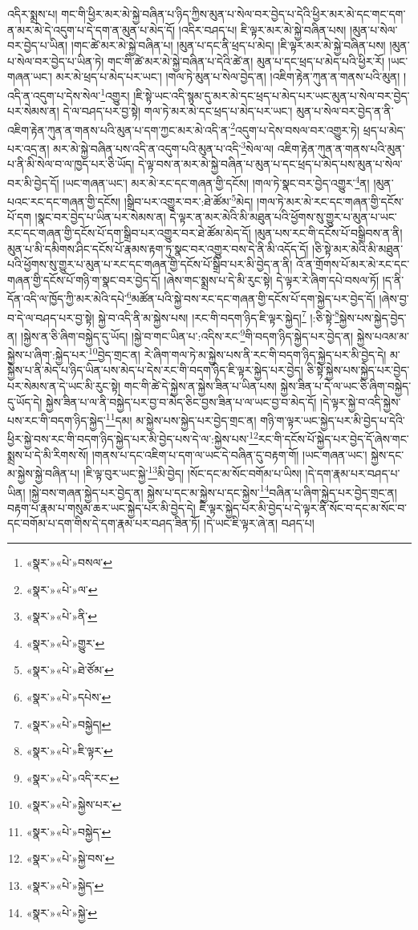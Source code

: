 འདིར་སྨྲས་པ། གང་གི་ཕྱིར་མར་མེ་སྐྱེ་བཞིན་པ་ཉིད་ཀྱིས་མུན་པ་སེལ་བར་བྱེད་པ་དེའི་ཕྱིར་མར་མེ་དང་གང་དག་ན་མར་མེ་དེ་འདུག་པ་དེ་དག་ན་མུན་པ་མེད་དོ། །འདིར་བཤད་པ། ཇི་ལྟར་མར་མེ་སྐྱེ་བཞིན་པས། །མུན་པ་སེལ་བར་བྱེད་པ་ཡིན། །གང་ཚེ་མར་མེ་སྐྱེ་བཞིན་པ། །མུན་པ་དང་ནི་ཕྲད་པ་མེད། །ཇི་ལྟར་མར་མེ་སྐྱེ་བཞིན་པས། །མུན་པ་སེལ་བར་བྱེད་པ་ཡིན་ཏེ། གང་གི་ཚེ་མར་མེ་སྐྱེ་བཞིན་པ་དེའི་ཚེ་ན། མུན་པ་དང་ཕྲད་པ་མེད་པའི་ཕྱིར་རོ། །ཡང་གཞན་ཡང་། མར་མེ་ཕྲད་པ་མེད་པར་ཡང་། །གལ་ཏེ་མུན་པ་སེལ་བྱེད་ན། །འཇིག་རྟེན་ཀུན་ན་གནས་པའི་མུན། །འདི་ན་འདུག་པ་དེས་སེལ་\footnote{«སྣར་»«པེ་»བསལ་}འགྱུར། །ཇི་སྟེ་ཡང་འདི་སྙམ་དུ་མར་མེ་དང་ཕྲད་པ་མེད་པར་ཡང་མུན་པ་སེལ་བར་བྱེད་པར་སེམས་ན། དེ་ལ་བཤད་པར་བྱ་སྟེ། གལ་ཏེ་མར་མེ་དང་ཕྲད་པ་མེད་པར་ཡང་། མུན་པ་སེལ་བར་བྱེད་ན་ནི་འཇིག་རྟེན་ཀུན་ན་གནས་པའི་མུན་པ་དག་ཀྱང་མར་མེ་འདི་ན་\footnote{«སྣར་»«པེ་»ལ་}འདུག་པ་དེས་བསལ་བར་འགྱུར་ཏེ། ཕྲད་པ་མེད་པར་འདྲ་ན། མར་མེ་སྐྱེ་བཞིན་པས་འདི་ན་འདུག་པའི་མུན་པ་འདི་\footnote{«སྣར་»«པེ་»ནི་}སེལ་ལ། འཇིག་རྟེན་ཀུན་ན་གནས་པའི་མུན་པ་ནི་མི་སེལ་བ་ལ་ཁྱད་པར་ཅི་ཡོད། དེ་ལྟ་བས་ན་མར་མེ་སྐྱེ་བཞིན་པ་མུན་པ་དང་ཕྲད་པ་མེད་པས་མུན་པ་སེལ་བར་མི་བྱེད་དོ། །ཡང་གཞན་ཡང་། མར་མེ་རང་དང་གཞན་གྱི་དངོས། །གལ་ཏེ་སྣང་བར་བྱེད་འགྱུར་\footnote{«སྣར་»«པེ་»གྱུར་}ན། །མུན་པའང་རང་དང་གཞན་གྱི་དངོས། །སྒྲིབ་པར་འགྱུར་བར་:ཐེ་ཚོམ་\footnote{«སྣར་»«པེ་»ཐེ་ཙོམ་}མེད། །གལ་ཏེ་མར་མེ་རང་དང་གཞན་གྱི་དངོས་པོ་དག །སྣང་བར་བྱེད་པ་ཡིན་པར་སེམས་ན། དེ་ལྟར་ན་མར་མེའི་མི་མཐུན་པའི་ཕྱོགས་སུ་གྱུར་པ་མུན་པ་ཡང་རང་དང་གཞན་གྱི་དངོས་པོ་དག་སྒྲིབ་པར་འགྱུར་བར་ཐེ་ཚོམ་མེད་དོ། །མུན་པས་རང་གི་དངོས་པོ་བསྒྲིབས་ན་ནི། མུན་པ་མི་དམིགས་ཤིང་དངོས་པོ་རྣམས་རྟག་ཏུ་སྣང་བར་འགྱུར་བས་དེ་ནི་མི་འདོད་དོ། །ཅི་སྟེ་མར་མེའི་མི་མཐུན་པའི་ཕྱོགས་སུ་གྱུར་པ་མུན་པ་རང་དང་གཞན་གྱི་དངོས་པོ་སྒྲིབ་པར་མི་བྱེད་ན་ནི། འོ་ན་གྲོགས་པོ་མར་མེ་རང་དང་གཞན་གྱི་དངོས་པོ་གཉི་ག་སྣང་བར་བྱེད་དོ། །ཞེས་གང་སྨྲས་པ་དེ་མི་རུང་སྟེ། དེ་ལྟར་རེ་ཞིག་དཔེ་བསལ་ཏོ། །ད་ནི་དོན་འདི་ལ་ཁྱོད་ཀྱི་མར་མེའི་དཔེ་\footnote{«སྣར་»«པེ་»དཔེས་}མཚོན་པའི་སྐྱེ་བས་རང་དང་གཞན་གྱི་དངོས་པོ་དག་སྐྱེད་པར་བྱེད་དོ། །ཞེས་བྱ་བ་དེ་ལ་བཤད་པར་བྱ་སྟེ། སྐྱེ་བ་འདི་ནི་མ་སྐྱེས་པས། །རང་གི་བདག་ཉིད་ཇི་ལྟར་སྐྱེད།\footnote{«སྣར་»«པེ་»བསྐྱེད།} །:ཅི་སྟེ་\footnote{«སྣར་»«པེ་»ཇི་ལྟར་}སྐྱེས་པས་སྐྱེད་བྱེད་ན། །སྐྱེས་ན་ཅི་ཞིག་བསྐྱེད་དུ་ཡོད། །སྐྱེ་བ་གང་ཡིན་པ་:འདིས་རང་\footnote{«སྣར་»«པེ་»འདི་རང་}གི་བདག་ཉིད་སྐྱེད་པར་བྱེད་ན། སྐྱེས་པའམ་མ་སྐྱེས་པ་ཞིག་:སྐྱེད་པར་\footnote{«སྣར་»«པེ་»སྐྱེས་པར་}བྱེད་གྲང་ན། རེ་ཞིག་གལ་ཏེ་མ་སྐྱེས་པས་ནི་རང་གི་བདག་ཉིད་སྐྱེད་པར་མི་བྱེད་དེ། མ་སྐྱེས་པ་ནི་མེད་པ་ཉིད་ཡིན་པས་མེད་པ་དེས་རང་གི་བདག་ཉིད་ཇི་ལྟར་སྐྱེད་པར་བྱེད། ཅི་སྟེ་སྐྱེས་པས་སྐྱེད་པར་བྱེད་པར་སེམས་ན་དེ་ཡང་མི་རུང་སྟེ། གང་གི་ཚེ་དེ་སྐྱེས་ན་སྐྱེས་ཟིན་པ་ཡིན་པས། སྐྱེས་ཟིན་པ་དེ་ལ་ཡང་ཅི་ཞིག་བསྐྱེད་དུ་ཡོད་དེ། སྐྱེས་ཟིན་པ་ལ་ནི་བསྐྱེད་པར་བྱ་བ་མེད་ཅིང་བྱས་ཟིན་པ་ལ་ཡང་བྱ་བ་མེད་དོ། །དེ་ལྟར་སྐྱེ་བ་འདི་སྐྱེས་པས་རང་གི་བདག་ཉིད་སྐྱེད་\footnote{«སྣར་»«པེ་»བསྐྱེད་}དམ། མ་སྐྱེས་པས་སྐྱེད་པར་བྱེད་གྲང་ན། གཉི་ག་ལྟར་ཡང་སྐྱེད་པར་མི་བྱེད་པ་དེའི་ཕྱིར་སྐྱེ་བས་རང་གི་བདག་ཉིད་སྐྱེད་པར་མི་བྱེད་པས་དེ་ལ་:སྐྱེས་པས་\footnote{«སྣར་»«པེ་»སྐྱེ་བས་}རང་གི་དངོས་པོ་སྐྱེད་པར་བྱེད་དོ་ཞེས་གང་སྨྲས་པ་དེ་མི་རིགས་སོ། །གནས་པ་དང་འཇིག་པ་དག་ལ་ཡང་དེ་བཞིན་དུ་བརྟག་གོ། །ཡང་གཞན་ཡང་། སྐྱེས་དང་མ་སྐྱེས་སྐྱེ་བཞིན་པ། །ཇི་ལྟ་བུར་ཡང་སྐྱེ་\footnote{«སྣར་»«པེ་»སྐྱེད་}མི་བྱེད། །སོང་དང་མ་སོང་བགོམ་པ་ཡིས། །དེ་དག་རྣམ་པར་བཤད་པ་ཡིན། །སྐྱེ་བས་གཞན་སྐྱེད་པར་བྱེད་ན། སྐྱེས་པ་དང་མ་སྐྱེས་པ་དང་སྐྱེས་\footnote{«སྣར་»«པེ་»སྐྱེ་}བཞིན་པ་ཞིག་སྐྱེད་པར་བྱེད་གྲང་ན། བརྟག་པ་རྣམ་པ་གསུམ་ཆར་ཡང་སྐྱེད་པར་མི་བྱེད་དེ། ཇི་ལྟར་སྐྱེད་པར་མི་བྱེད་པ་དེ་ལྟར་ནི་སོང་བ་དང་མ་སོང་བ་དང་བགོམ་པ་དག་གིས་དེ་དག་རྣམ་པར་བཤད་ཟིན་ཏོ། །དེ་ཡང་ཇི་ལྟར་ཞེ་ན། བཤད་པ། 